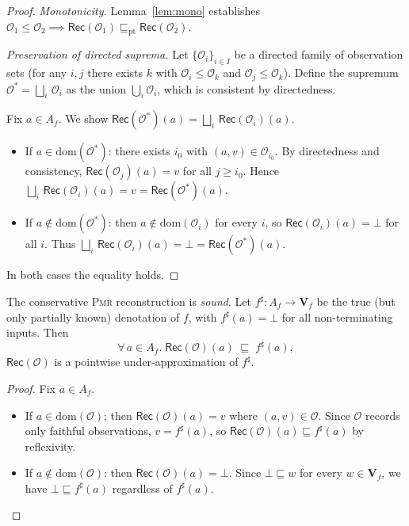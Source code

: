 \documentclass[11pt]{article}
\newcommand{\pdom}{\mathrm{dom}}             %
\newcommand{\Apx}{\sqsubseteq}              %
\newcommand{\Lub}{\bigsqcup}               %
\newcommand{\PMR}{\textsc{Pmr}}            %
\newcommand{\ObsSet}{\mathcal{O}}          %
\newcommand{\RecAlg}{\mathsf{Rec}}         %
\newcommand{\PVal}{\mathbf{V}}             %
\begin{document}
\begin{proof}
\textit{Monotonicity.}  Lemma~\ref{lem:mono} establishes
$\ObsSet_1 \leq \ObsSet_2 \implies
\RecAlg(\ObsSet_1) \Apx_\mathrm{pt} \RecAlg(\ObsSet_2)$.

\textit{Preservation of directed suprema.}  Let
$\{\ObsSet_i\}_{i \in I}$ be a directed family of observation sets
(\ie for any $i,j$ there exists $k$ with
$\ObsSet_i \leq \ObsSet_k$ and $\ObsSet_j \leq \ObsSet_k$).  Define
the supremum $\ObsSet^* = \Lub_i\, \ObsSet_i$ as the union
$\bigcup_i \ObsSet_i$, which is consistent by directedness.

Fix $a \in A_f$.  We show
$\RecAlg(\ObsSet^*)(a) = \Lub_i\, \RecAlg(\ObsSet_i)(a)$.

\begin{itemize}
  \item If $a \in \pdom(\ObsSet^*)$: there exists $i_0$ with
        $(a, v) \in \ObsSet_{i_0}$.  By directedness and consistency,
        $\RecAlg(\ObsSet_j)(a) = v$ for all $j \ge i_0$.  Hence
        $\Lub_i\, \RecAlg(\ObsSet_i)(a) = v = \RecAlg(\ObsSet^*)(a)$.
  \item If $a \notin \pdom(\ObsSet^*)$: then
        $a \notin \pdom(\ObsSet_i)$ for every $i$, so
        $\RecAlg(\ObsSet_i)(a) = \bot$ for all $i$.  Thus
        $\Lub_i\, \RecAlg(\ObsSet_i)(a) = \bot =
        \RecAlg(\ObsSet^*)(a)$.
\end{itemize}
In both cases the equality holds.
\end{proof}

\begin{theorem}[Soundness of \PMR{}]\label{thm:soundness}
The conservative \PMR{} reconstruction is \emph{sound}.  Let
$f^\sharp : A_f \to \PVal_f$ be the true (but only partially known)
denotation of $f$, with $f^\sharp(a) = \bot$ for all non-terminating
inputs.  Then
\[
  \forall\, a \in A_f.\;
  \RecAlg(\ObsSet)(a) \;\Apx\; f^\sharp(a),
\]
\ie $\RecAlg(\ObsSet)$ is a pointwise under-approximation of
$f^\sharp$.
\end{theorem}

\begin{proof}
Fix $a \in A_f$.
\begin{itemize}
  \item If $a \in \pdom(\ObsSet)$: then $\RecAlg(\ObsSet)(a) = v$
        where $(a, v) \in \ObsSet$.  Since $\ObsSet$ records only
        faithful observations, $v = f^\sharp(a)$, so
        $\RecAlg(\ObsSet)(a) \Apx f^\sharp(a)$ by reflexivity.
  \item If $a \notin \pdom(\ObsSet)$: then $\RecAlg(\ObsSet)(a) = \bot$.
        Since $\bot \Apx w$ for every $w \in \PVal_f$, we have
        $\bot \Apx f^\sharp(a)$ regardless of $f^\sharp(a)$.
\end{itemize}
\end{proof}
\end{document}
